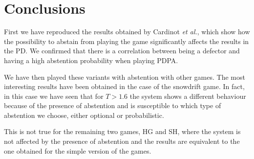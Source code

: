 \documentclass[12pt,oneside,a4paper,fleqn]{article}
\begin{document}
\section{Conclusions}
\label{sec:conclusions}

First we have reproduced the results obtained by Cardinot \emph{et al.}, which show how the possibility to abstain from playing the game significantly affects the results in the PD.
We confirmed that there is a correlation between being a defector and having a high abstention probability when playing PDPA.

We have then played these variants with abstention with other games.
The most interesting results have been obtained in the case of the snowdrift game. In fact, in this case we have seen that for $T > 1.6$ the system shows a different behaviour because of the presence of abstention and is susceptible to  which type of abstention we choose, either optional or probabilistic.

This is not true for the remaining two games, HG and SH, where the system is not affected by the presence of abstention and the results are equivalent to the one obtained for the simple version of the games.


%
%    
%    

\newpage

\printbibliography
\end{document}
